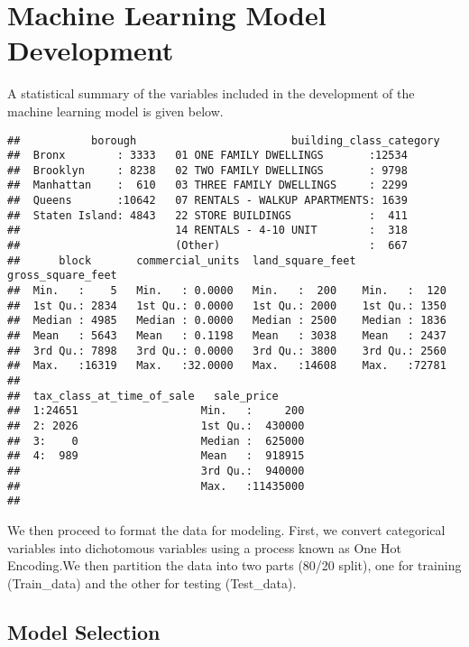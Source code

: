 \documentclass[
]{article}
\begin{document}
\newpage

\hypertarget{machine-learning-model-development}{%
\section{Machine Learning Model Development}\label{machine-learning-model-development}}

A statistical summary of the variables included in the development of the machine learning model is given below.

\begin{verbatim}
##           borough                        building_class_category
##  Bronx        : 3333   01 ONE FAMILY DWELLINGS       :12534     
##  Brooklyn     : 8238   02 TWO FAMILY DWELLINGS       : 9798     
##  Manhattan    :  610   03 THREE FAMILY DWELLINGS     : 2299     
##  Queens       :10642   07 RENTALS - WALKUP APARTMENTS: 1639     
##  Staten Island: 4843   22 STORE BUILDINGS            :  411     
##                        14 RENTALS - 4-10 UNIT        :  318     
##                        (Other)                       :  667     
##      block       commercial_units  land_square_feet gross_square_feet
##  Min.   :    5   Min.   : 0.0000   Min.   :  200    Min.   :  120    
##  1st Qu.: 2834   1st Qu.: 0.0000   1st Qu.: 2000    1st Qu.: 1350    
##  Median : 4985   Median : 0.0000   Median : 2500    Median : 1836    
##  Mean   : 5643   Mean   : 0.1198   Mean   : 3038    Mean   : 2437    
##  3rd Qu.: 7898   3rd Qu.: 0.0000   3rd Qu.: 3800    3rd Qu.: 2560    
##  Max.   :16319   Max.   :32.0000   Max.   :14608    Max.   :72781    
##                                                                      
##  tax_class_at_time_of_sale   sale_price      
##  1:24651                   Min.   :     200  
##  2: 2026                   1st Qu.:  430000  
##  3:    0                   Median :  625000  
##  4:  989                   Mean   :  918915  
##                            3rd Qu.:  940000  
##                            Max.   :11435000  
## 
\end{verbatim}

We then proceed to format the data for modeling. First, we convert categorical variables into dichotomous variables using a process known as One Hot Encoding.We then partition the data into two parts (80/20 split), one for training (Train\_data) and the other for testing (Test\_data).

\hypertarget{model-selection}{%
\subsection{Model Selection}\label{model-selection}}
\end{document}
